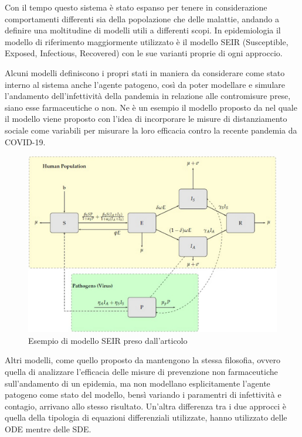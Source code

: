 
Con il tempo questo sistema è stato espanso per tenere in considerazione comportamenti
differenti sia della popolazione che delle malattie, andando a definire una moltitudine
di modelli utili a differenti scopi. In epidemiologia il modello di
riferimento maggiormente utilizzato è il modello SEIR (Susceptible, Exposed, Infectious, Recovered)
con le sue varianti proprie di ogni approccio.

Alcuni modelli definiscono i propri stati in maniera da considerare 
come stato interno al sistema anche l'agente patogeno, così da 
poter modellare e simulare l'andamento dell'infettività della pandemia 
in relazione alle contromisure prese, siano esse farmaceutiche o non.
Ne è un esempio il modello proposto da \cite{Mwalili2020} nel quale 
il modello viene proposto con l'idea di incorporare le misure di 
distanziamento sociale come variabili per misurare la loro efficacia
contro la recente pandemia da COVID-19.

\begin{figure}[h]
    \includegraphics[width=\linewidth]{img/13104_2020_5192_Fig1_HTML.png}
    \caption{Esempio di modello SEIR preso dall'articolo \cite{Mwalili2020}}
    \label{fig:SEIR_model_social_distancing}
\end{figure}

Altri modelli, come quello proposto da \cite{ijerph17103535} mantengono 
la stessa filosofia, ovvero quella di analizzare l'efficacia delle misure 
di prevenzione non farmaceutiche sull'andamento di un epidemia, ma non
modellano esplicitamente l'agente patogeno come stato del modello, bensì
variando i paramentri di infettività e contagio, arrivano allo stesso 
risultato. Un'altra differenza tra i due approcci è quella della tipologia
di equazioni differenziali utilizzate, \cite{Mwalili2020} hanno utilizzato 
delle ODE mentre \cite{ijerph17103535} delle SDE.

